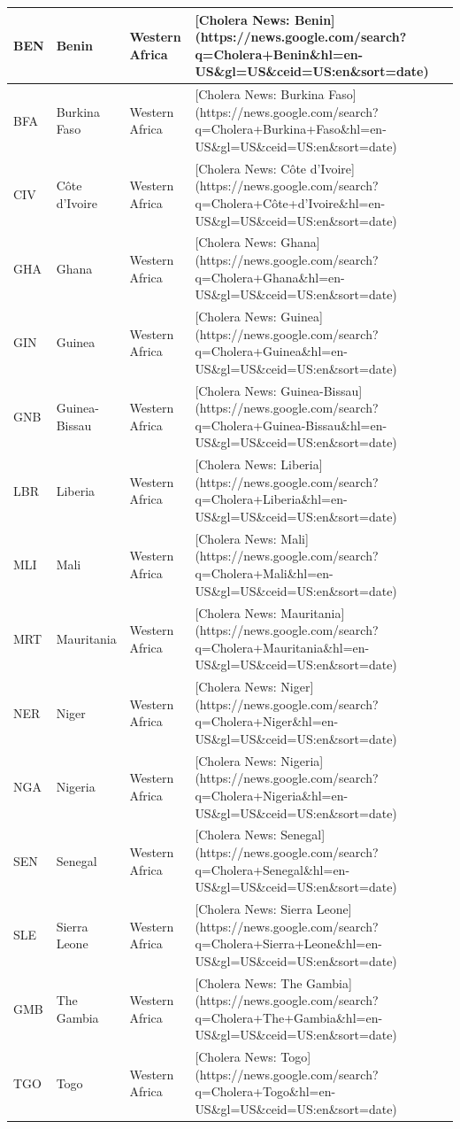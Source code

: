 \documentclass[
]{book}
\begin{document}
\begin{table}
\begin{tabular}[t]{l|l|l|l}
\hline
BEN & Benin & Western Africa & [Cholera News: Benin](https://news.google.com/search?q=Cholera+Benin\&hl=en-US\&gl=US\&ceid=US:en\&sort=date)\\
\hline
BFA & Burkina Faso & Western Africa & [Cholera News: Burkina Faso](https://news.google.com/search?q=Cholera+Burkina+Faso\&hl=en-US\&gl=US\&ceid=US:en\&sort=date)\\
\hline
CIV & Côte d'Ivoire & Western Africa & [Cholera News: Côte d'Ivoire](https://news.google.com/search?q=Cholera+Côte+d'Ivoire\&hl=en-US\&gl=US\&ceid=US:en\&sort=date)\\
\hline
GHA & Ghana & Western Africa & [Cholera News: Ghana](https://news.google.com/search?q=Cholera+Ghana\&hl=en-US\&gl=US\&ceid=US:en\&sort=date)\\
\hline
GIN & Guinea & Western Africa & [Cholera News: Guinea](https://news.google.com/search?q=Cholera+Guinea\&hl=en-US\&gl=US\&ceid=US:en\&sort=date)\\
\hline
GNB & Guinea-Bissau & Western Africa & [Cholera News: Guinea-Bissau](https://news.google.com/search?q=Cholera+Guinea-Bissau\&hl=en-US\&gl=US\&ceid=US:en\&sort=date)\\
\hline
LBR & Liberia & Western Africa & [Cholera News: Liberia](https://news.google.com/search?q=Cholera+Liberia\&hl=en-US\&gl=US\&ceid=US:en\&sort=date)\\
\hline
MLI & Mali & Western Africa & [Cholera News: Mali](https://news.google.com/search?q=Cholera+Mali\&hl=en-US\&gl=US\&ceid=US:en\&sort=date)\\
\hline
MRT & Mauritania & Western Africa & [Cholera News: Mauritania](https://news.google.com/search?q=Cholera+Mauritania\&hl=en-US\&gl=US\&ceid=US:en\&sort=date)\\
\hline
NER & Niger & Western Africa & [Cholera News: Niger](https://news.google.com/search?q=Cholera+Niger\&hl=en-US\&gl=US\&ceid=US:en\&sort=date)\\
\hline
NGA & Nigeria & Western Africa & [Cholera News: Nigeria](https://news.google.com/search?q=Cholera+Nigeria\&hl=en-US\&gl=US\&ceid=US:en\&sort=date)\\
\hline
SEN & Senegal & Western Africa & [Cholera News: Senegal](https://news.google.com/search?q=Cholera+Senegal\&hl=en-US\&gl=US\&ceid=US:en\&sort=date)\\
\hline
SLE & Sierra Leone & Western Africa & [Cholera News: Sierra Leone](https://news.google.com/search?q=Cholera+Sierra+Leone\&hl=en-US\&gl=US\&ceid=US:en\&sort=date)\\
\hline
GMB & The Gambia & Western Africa & [Cholera News: The Gambia](https://news.google.com/search?q=Cholera+The+Gambia\&hl=en-US\&gl=US\&ceid=US:en\&sort=date)\\
\hline
TGO & Togo & Western Africa & [Cholera News: Togo](https://news.google.com/search?q=Cholera+Togo\&hl=en-US\&gl=US\&ceid=US:en\&sort=date)\\
\hline
\end{tabular}
\end{table}
\end{document}

